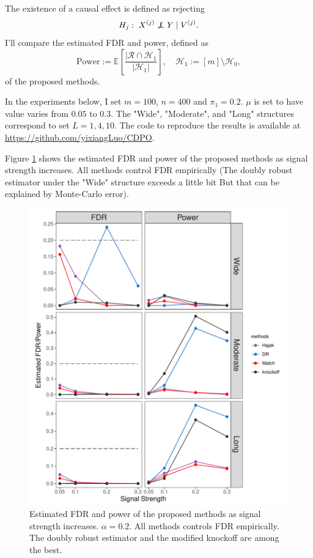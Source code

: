 \documentclass[11pt]{article}
\newcommand{\cH}{\mathcal{H}}
\newcommand{\cR}{\mathcal{R}}
\newcommand\indpt{\protect\mathpalette{\protect\indpT}{\perp}}
\def\indpT#1#2{\mathrel{\rlap{$#1#2$}\mkern2mu{#1#2}}}
\newcommand{\EE}{\mathbb{E}}
\begin{document}
The existence of a causal effect is defined as rejecting
\[ H_j: \; X^{(j)} \not \indpt Y \mid V^{(j)}. \]
I'll compare the estimated FDR and power, defined as
\[
    \text{Power} := \EE[\frac{|\cR \cap \cH_1}{|\cH_1|}],\quad
    \cH_1 := [m] \setminus \cH_0,
\]
of the proposed methods.

In the experiments below, I set $m = 100$, $n = 400$ and $\pi_1 = 0.2$. $\mu$ is set to have value varies from $0.05$ to $0.3$. The "Wide", "Moderate", and "Long" structures correspond to set $L = 1, 4, 10$. The code to reproduce the results is available at \url{https://github.com/yixiangLuo/CDPO}. 

Figure \ref{fig:pos_signal} shows the estimated FDR and power of the proposed methods as signal strength increases. All methods control FDR empirically (The doubly robust estimator under the "Wide" structure exceeds a little bit But that can be explained by Monte-Carlo error).

\begin{figure}[!htb]
    \centering
    \includegraphics[width = 1\textwidth]{simu-pos_signal.pdf}
    \caption{Estimated FDR and power of the proposed methods as signal strength increases. $\alpha = 0.2$. All methods controls FDR empirically. The doubly robust estimator and the modified knockoff are among the best.}
    \label{fig:pos_signal}
\end{figure}
\end{document}
